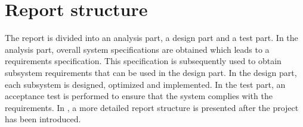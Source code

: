 \section*{Report structure}
The report is divided into an analysis part, a design part and a test part. In the analysis part, overall system specifications are obtained which leads to a requirements specification. This specification is subsequently used to obtain subsystem requirements that can be used in the design part. In the design part, each subsystem is designed, optimized and implemented. In the test part, an acceptance test is performed to ensure that the system complies with the requirements. In , a more detailed report structure is presented after the project has been introduced.


